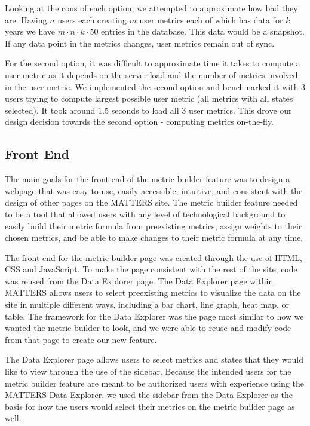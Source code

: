 		Looking at the cons of each option, we attempted to approximate how bad they are. Having $n$ users each creating $m$ user metrics each of which has data for $k$ years we have $m \cdot n \cdot k \cdot 50$ entries in the database. This data would be a snapshot. If any data point in the metrics changes, user metrics remain out of sync.

		For the second option, it was difficult to approximate time it takes to compute a user metric as it depends on the server load and the number of metrics involved in the user metric. We implemented the second option and benchmarked it with $3$ users trying to compute largest possible user metric (all metrics with all states selected). It took around $1.5$ seconds to load all $3$ user metrics. This drove our design decision towards the second option - computing metrics on-the-fly.

	\subsection{Front End}
	
	The main goals for the front end of the metric builder feature was to design a webpage that was easy to use, easily accessible, intuitive, and consistent with the design of other pages on the MATTERS site. The metric builder feature needed to be a tool that allowed users with any level of technological background to easily build their metric formula from preexisting metrics, assign weights to their chosen metrics, and be able to make changes to their metric formula at any time.
	
	The front end for the metric builder page was created through the use of HTML, CSS and JavaScript. To make the page consistent with the rest of the site, code was reused from the Data Explorer page. The Data Explorer page within MATTERS allows users to select preexisting metrics to visualize the data on the site in multiple different ways, including a bar chart, line graph, heat map, or table. The framework for the Data Explorer was the page most similar to how we wanted the metric builder to look, and we were able to reuse and modify code from that page to create our new feature. 
	
	The Data Explorer page allows users to select metrics and states that they would like to view through the use of the sidebar. Because the intended users for the metric builder feature are meant to be authorized users with experience using the MATTERS Data Explorer, we used the sidebar from the Data Explorer as the basis for how the users would select their metrics on the metric builder page as well.  
	

